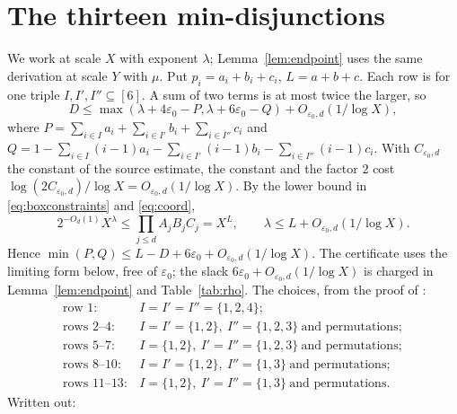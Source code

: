 \documentclass{amsart}
\numberwithin{equation}{section}
\numberwithin{table}{section}
\begin{document}
\appendix

\section{The thirteen min-disjunctions}\label{app:geom}

We work at scale $X$ with exponent $\lambda$; Lemma~\ref{lem:endpoint} uses
the same derivation at scale $Y$ with $\mu$. Put $p_i=a_i+b_i+c_i$,
$L=a+b+c$. Each row is \cite[Proposition~4.1]{BBLT}
for one triple $I,I',I''\subseteq[6]$. A sum of two terms is at most twice
the larger, so
\[
D\le\max(\lambda+4\varepsilon_0-P,\lambda+6\varepsilon_0-Q)
+O_{\varepsilon_0,d}(1/\log X),
\]
where
$P=\sum_{i\in I}a_i+\sum_{i\in I'}b_i+\sum_{i\in I''}c_i$ and
$Q=1-\sum_{i\in I}(i-1)a_i-\sum_{i\in I'}(i-1)b_i
 -\sum_{i\in I''}(i-1)c_i$. With $C_{\varepsilon_0,d}$ the constant of the
source estimate, the constant and the factor $2$ cost
$\log(2C_{\varepsilon_0,d})/\log X=O_{\varepsilon_0,d}(1/\log X)$. By the lower
bound in \eqref{eq:boxconstraints} and \eqref{eq:coord},
\[
 2^{-O_d(1)}X^\lambda\le\prod_{j\le d}A_jB_jC_j=X^L,
 \qquad \lambda\le L+O_{\varepsilon_0,d}(1/\log X).
\]
Hence
$\min(P,Q)\le L-D+6\varepsilon_0+O_{\varepsilon_0,d}(1/\log X)$.
The certificate uses the limiting form below, free of $\varepsilon_0$; the
slack $6\varepsilon_0+O_{\varepsilon_0,d}(1/\log X)$ is charged in
Lemma~\ref{lem:endpoint} and Table~\ref{tab:rho}. The choices, from the proof
of \cite[Theorem~1.3]{BBLT}:
\[
\begin{array}{ll}
 \text{row }1: & I=I'=I''=\{1,2,4\};\\
 \text{rows }2\text{--}4: & I=I'=\{1,2\},\ I''=\{1,2,3\}\ \text{and permutations};\\
 \text{rows }5\text{--}7: & I=\{1,2\},\ I'=I''=\{1,2,3\}\ \text{and permutations};\\
 \text{rows }8\text{--}10: & I=I'=\{1,2\},\ I''=\{1,3\}\ \text{and permutations};\\
 \text{rows }11\text{--}13: & I=\{1,2\},\ I'=I''=\{1,3\}\ \text{and permutations}.
\end{array}
\]
Written out:
\end{document}
